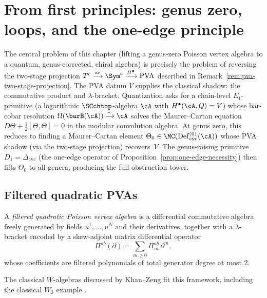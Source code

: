 \section{From first principles: genus zero, loops, and the one-edge principle}

\begin{remark}
\label{rem:quantization-e1-pva-lift}
The central problem of this chapter (lifting a genus-zero
Poisson vertex algebra to a quantum, genus-corrected, chiral
algebra) is precisely the problem of reversing the two-stage
projection
$T^c \xrightarrow{\mathrm{av}} \Sym^c \xrightarrow{H^\bullet}
\mathrm{PVA}$
described in Remark~\textup{\ref{rem:pva-two-stage-projection}}.
The PVA datum $V$ supplies the classical shadow: the commutative
product and $\lambda$-bracket. Quantization asks for a chain-level
$E_1$-primitive (a logarithmic $\SCchtop$-algebra $\cA$ with
$H^\bullet(\cA, Q) = V$) whose bar-cobar resolution
$\Omega(\barB(\cA)) \xrightarrow{\sim} \cA$ solves the Maurer--Cartan
equation $D\Theta + \frac{1}{2}[\Theta, \Theta] = 0$ in the
modular convolution algebra. At genus zero, this reduces to
finding a Maurer--Cartan element
$\Theta_0 \in \MC(\Def_{\mathrm{cyc}}^{(0)}(\cA))$
whose PVA shadow (via the two-stage projection) recovers~$V$.
The genus-raising primitive $D_1 = \Delta_{\mathrm{cyc}}$
(the one-edge operator of
Proposition~\ref{prop:one-edge-necessity}) then lifts $\Theta_0$ to
all genera, producing the full obstruction tower.
\end{remark}

\subsection{Filtered quadratic PVAs}

\begin{definition}
A \emph{filtered quadratic Poisson vertex algebra} is a differential commutative algebra
freely generated by fields $u^1,\dots,u^N$ and their derivatives, together with a
$\lambda$-bracket encoded by a skew-adjoint matrix differential operator
\[
\Pi^{ab}(\partial)=\sum_{m\ge 0}\Pi^{ab}_m\,\partial^m,
\]
whose coefficients are filtered polynomials of total generator degree at most $2$.
\end{definition}

The classical $W$-algebras discussed by Khan--Zeng fit this framework, including the
classical $W_3$ example \cite{KZ25}.

